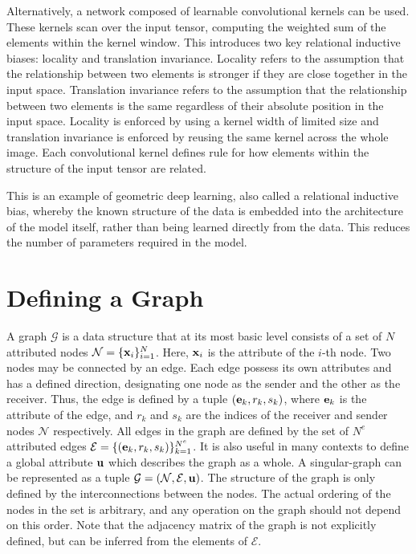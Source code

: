 Alternatively, a network composed of learnable convolutional kernels can be used.
These kernels scan over the input tensor, computing the weighted sum of the elements within the kernel window.
This introduces two key relational inductive biases: locality and translation invariance.
Locality refers to the assumption that the relationship between two elements is stronger if they are close together in the input space.
Translation invariance refers to the assumption that the relationship between two elements is the same regardless of their absolute position in the input space.
Locality is enforced by using a kernel width of limited size and translation invariance is enforced by reusing the same kernel across the whole image.
Each convolutional kernel defines rule for how elements within the structure of the input tensor are related.

This is an example of geometric deep learning, also called a relational inductive bias, whereby the known structure of the data is embedded into the architecture of the model itself, rather than being learned directly from the data.
This reduces the number of parameters required in the model.

\section{Defining a Graph}
\label{sec:graph_definition}

A graph $\mathcal{G}$ is a data structure that at its most basic level consists of a set of $N$ attributed nodes $\mathcal{N} = \{\mathbf{x}_i\}_{i=1}^{N}$.
Here, $\mathbf{x}_i$ is the attribute of the $i$-th node.
Two nodes may be connected by an edge.
Each edge possess its own attributes and has a defined direction, designating one node as the sender and the other as the receiver.
Thus, the edge is defined by a tuple $(\mathbf{e}_k, r_k, s_k)$, where $\mathbf{e}_k$ is the attribute of the edge, and $r_k$ and $s_k$ are the indices of the receiver and sender nodes $\mathcal{N}$ respectively.
All edges in the graph are defined by the set of $N^e$ attributed edges $\mathcal{E} = \{(\mathbf{e}_k, r_k, s_k)\}_{k=1}^{N^e}$.
It is also useful in many contexts to define a global attribute $\mathbf{u}$ which describes the graph as a whole.
A singular-graph can be represented as a tuple $\mathcal{G} = (\mathcal{N}, \mathcal{E}, \mathbf{u})$.
The structure of the graph is only defined by the interconnections between the nodes.
The actual ordering of the nodes in the set is arbitrary, and any operation on the graph should not depend on this order.
Note that the adjacency matrix of the graph is not explicitly defined, but can be inferred from the elements of $\mathcal{E}$.

